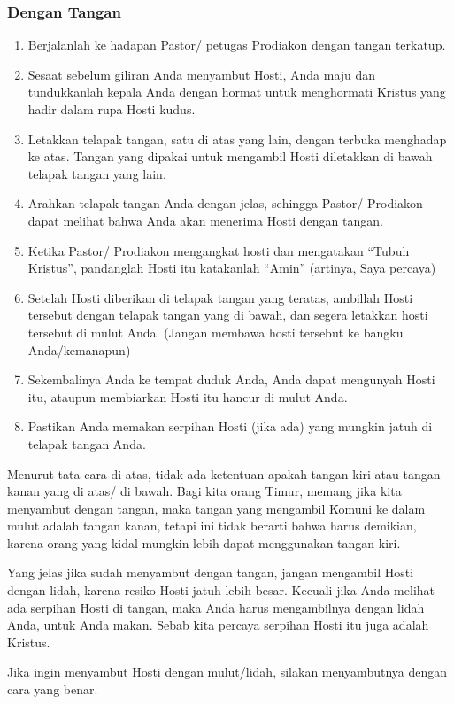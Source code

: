 \subsubsection*{Dengan Tangan}
\begin{enumerate}
\item        Berjalanlah ke hadapan Pastor/ petugas Prodiakon dengan tangan terkatup.
\item        Sesaat sebelum giliran Anda menyambut Hosti, Anda maju dan tundukkanlah kepala Anda dengan hormat untuk menghormati Kristus yang hadir dalam rupa Hosti kudus.
\item        Letakkan telapak tangan, satu di atas yang lain, dengan terbuka menghadap ke atas. Tangan yang dipakai untuk mengambil Hosti diletakkan di bawah telapak tangan yang lain.
\item        Arahkan telapak tangan Anda dengan jelas, sehingga Pastor/ Prodiakon dapat melihat bahwa Anda akan menerima Hosti dengan tangan.
\item        Ketika Pastor/ Prodiakon mengangkat hosti dan mengatakan “Tubuh Kristus”, pandanglah Hosti itu katakanlah “Amin” (artinya, Saya percaya)
\item        Setelah Hosti diberikan di telapak tangan yang teratas, ambillah Hosti tersebut dengan telapak tangan yang di bawah, dan segera letakkan hosti tersebut di mulut Anda. (Jangan membawa hosti tersebut ke bangku Anda/kemanapun)
\item        Sekembalinya Anda ke tempat duduk Anda, Anda dapat mengunyah Hosti itu, ataupun membiarkan Hosti itu hancur di mulut Anda.
\item        Pastikan Anda memakan serpihan Hosti (jika ada) yang mungkin jatuh di telapak tangan Anda.
\end{enumerate}

Menurut tata cara di atas, tidak ada ketentuan apakah tangan kiri atau tangan kanan yang di atas/ di bawah. Bagi kita orang Timur, memang jika kita menyambut dengan tangan, maka tangan yang mengambil Komuni ke dalam mulut adalah tangan kanan, tetapi ini tidak berarti bahwa harus demikian, karena orang yang kidal mungkin lebih dapat menggunakan tangan kiri.

Yang jelas jika sudah menyambut dengan tangan, jangan mengambil Hosti dengan lidah, karena resiko Hosti jatuh lebih besar. Kecuali jika Anda melihat ada serpihan Hosti di tangan, maka Anda harus mengambilnya dengan lidah Anda, untuk Anda makan. Sebab kita percaya serpihan Hosti itu juga adalah Kristus.

Jika ingin menyambut Hosti dengan mulut/lidah, silakan menyambutnya dengan cara yang benar.